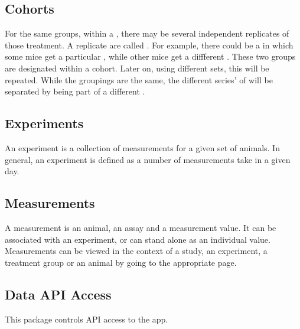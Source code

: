 \documentclass[letterpaper,10pt,english]{sphinxmanual}
\begin{document}
\subsection{Cohorts}
\label{data:cohorts}
For the same {\hyperref[data:mousedb.data.models.Treatment]{}} groups, within a {\hyperref[data:mousedb.data.models.Study]{}}, there may be several independent replicates of those treatment.  A replicate are called {\hyperref[data:mousedb.data.models.Cohort]{}}.  For example, there could be a {\hyperref[data:mousedb.data.models.Treatment]{}} in which some mice get a particular {\hyperref[data:mousedb.data.models.Diet]{}}, while other mice get a diffferent {\hyperref[data:mousedb.data.models.Diet]{}}.  These two {\hyperref[data:mousedb.data.models.Treatment]{}} groups are designated within a cohort.  Later on, using different {\hyperref[animals:mousedb.animal.models.Animal]{}} sets, this {\hyperref[data:mousedb.data.models.Study]{}} will be repeated.  While the {\hyperref[data:mousedb.data.models.Treatment]{}} groupings are the same, the different series' of {\hyperref[data:mousedb.data.models.Experiment]{}} will be separated by being part of a different {\hyperref[data:mousedb.data.models.Cohort]{}}.


\subsection{Experiments}
\label{data:experiments}
An experiment is a collection of measurements for a given set of animals.  In general, an experiment is defined as a number of measurements take in a given day.


\subsection{Measurements}
\label{data:measurements}
A measurement is an animal, an assay and a measurement value.  It can be associated with an experiment, or can stand alone as an individual value.  Measurements can be viewed in the context of a study, an experiment, a treatment group or an animal by going to the appropriate page.


\subsection{Data API Access}
\label{data:data-api-access}\label{data:module-mousedb.data.api}
This package controls API access to the {\hyperref[data:module-mousedb.data]{}} app.
\end{document}
